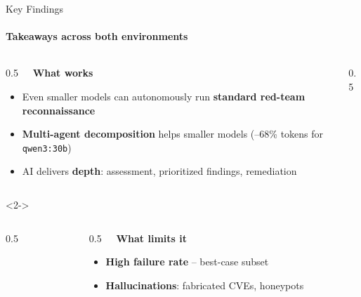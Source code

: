 \begin{frame}{Key Findings}
    \framesubtitle{Takeaways across both environments}

    \begin{columns}[T,onlytextwidth]
        \begin{column}{0.5\textwidth}
            \textbf{\faCheckCircle~~What works}
            \begin{itemize}
                \item \scriptsize Even smaller models can autonomously run \textbf{standard red-team reconnaissance}
                \item \scriptsize \textbf{Multi-agent decomposition} helps smaller models (--68\% tokens for \texttt{qwen3:30b})
                \item \scriptsize AI delivers \textbf{depth}: assessment, prioritized findings, remediation
            \end{itemize}
        \end{column}

        \begin{column}{0.5\textwidth}
        \end{column}
    \end{columns}

    \vspace{0.5em}

    \begin{onlyenv}<2->
        \begin{columns}[T,onlytextwidth]
            \begin{column}{0.5\textwidth}
            \end{column}

            \begin{column}{0.5\textwidth}
                \textbf{\faExclamationTriangle~~What limits it}
                \begin{itemize}
                    \item \scriptsize \textbf{High failure rate} -- best-case subset
                    \item \scriptsize \textbf{Hallucinations}: fabricated CVEs, honeypots
                \end{itemize}
            \end{column}
        \end{columns}
    \end{onlyenv}

\end{frame}


